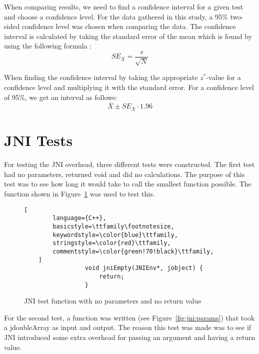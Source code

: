 When comparing results, we need to find a confidence interval for a given test and choose a confidence level. For the data gathered in this study, a 95\% two-sided confidence level was chosen when comparing the data. The confidence interval is calculated by taking the standard error of the mean which is found by using the following formula \cite[p.~304]{olofsson2012probability}:
\begin{equation*}
    SE_{\bar{X}} = \frac{s}{\sqrt{N}}
\end{equation*}

When finding the confidence interval by taking the appropriate $z^*$-value for a confidence level and multiplying it with the standard error. For a confidence level of 95\%, we get an interval as follows:
\begin{equation*}
    \bar{X} \pm SE_{\bar{X}} \cdot 1.96
\end{equation*}


\section{JNI Tests}
For testing the JNI overhead, three different tests were constructed. The first test had no parameters, returned void and did no calculations. The purpose of this test was to see how long it would take to call the smallest function possible. The function shown in Figure~\ref{fig:jni:empty} was used to test this.

\begin{figure}
\begin{lstlisting}[
        language={C++},
        basicstyle=\ttfamily\footnotesize,
        keywordstyle=\color{blue}\ttfamily,
        stringstyle=\color{red}\ttfamily,
        commentstyle=\color{green!70!black}\ttfamily,
    ]
                 void jniEmpty(JNIEnv*, jobject) {
                     return;
                 }
\end{lstlisting}
\caption{JNI test function with no parameters and no return value}
\label{fig:jni:empty}
\end{figure}

For the second test, a function was written (see Figure~\ref{fig:jni:params}) that took a jdoubleArray as input and output. The reason this test was made was to see if JNI introduced some extra overhead for passing an argument and having a return value.


